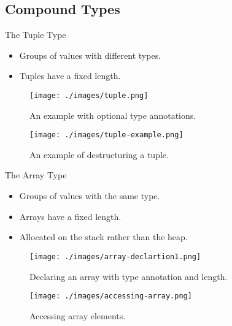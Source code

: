 \documentclass[10pt]{beamer}
\begin{document}
\subsection{Compound Types}
\begin{frame}{The Tuple Type}
    \begin{itemize}
        \item Groups of values with different types.
        \item Tuples have a fixed length.
    \end{itemize}

    \begin{figure}[htpb]
        \centering
        \texttt{[image: ./images/tuple.png]}
        \vspace*{-2mm}
        \caption{An example with optional type annotations.\cite{rust-book}}
    \end{figure}

    \vspace*{-5mm}
    \begin{figure}[htpb]
        \centering
        \texttt{[image: ./images/tuple-example.png]}
        \vspace*{-2mm}
        \caption{An example of destructuring a tuple.\cite{rust-book}}
    \end{figure}
\end{frame}

\begin{frame}{The Array Type}
    \begin{itemize}
        \item Groups of values with the same type.
        \item Arrays have a fixed length.
        \item Allocated on the stack rather than the heap.
    \end{itemize}

    \begin{figure}[htpb]
        \centering
        \texttt{[image: ./images/array-declartion1.png]}
        \vspace*{-2mm}
        \caption{Declaring an array with type annotation and length.\cite{rust-book}}
    \end{figure}

    \vspace*{-5mm}
    \begin{figure}[htpb]
        \centering
        \texttt{[image: ./images/accessing-array.png]}
        \vspace*{-2mm}
        \caption{Accessing array elements.\cite{rust-book}}
    \end{figure}
\end{frame}
\end{document}
